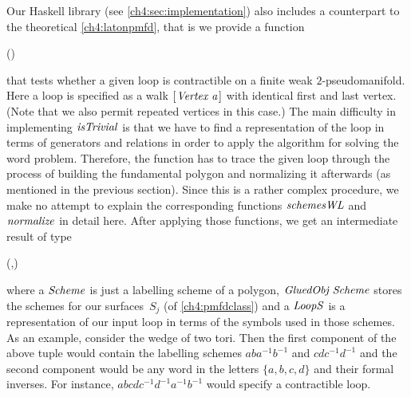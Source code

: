 \medskip
Our Haskell library (see \cref{ch4:sec:implementation}) also includes a
counterpart to the theoretical \cref{ch4:latonpmfd}, that is we provide
a function\begin{hscode}\SaveRestoreHook
{}%
%
%
\>[4]{}\mathbin{::}(\;)\Rightarrow {}\;\to {}\;\to {}\<[E]%
\ColumnHook
\end{hscode}\resethooks
that tests whether a given loop is contractible on a finite weak
$2$-pseudomanifold. Here a loop is specified as a walk \ensuremath{[\mskip1.5mu \Conid{Vertex}\;\Varid{a}\mskip1.5mu]} 
 with identical first and last vertex.
(Note that we also permit repeated vertices in this case.)
The main difficulty in implementing \ensuremath{\Varid{isTrivial}} is that we have
to find a representation of the loop in terms of generators and relations
in order to apply the algorithm for solving the word problem. Therefore,
the function has to trace the given loop through the process of building
the fundamental polygon and normalizing it afterwards (as mentioned in the
previous section). Since this is a rather complex procedure, we make no attempt
to explain the corresponding functions \ensuremath{\Varid{schemesWL}} and \ensuremath{\Varid{normalize}}
in detail here. After applying those functions, we get an intermediate
result of type \begin{hscode}\SaveRestoreHook
{}%
%
%
\>[3]{}(\;,){}\<[E]%
\ColumnHook
\end{hscode}\resethooks
where a \ensuremath{\Conid{Scheme}} is just a labelling scheme of a polygon, \ensuremath{\Conid{GluedObj}\;\Conid{Scheme}}
stores the schemes for our surfaces~$S_j$ (of \cref{ch4:pmfdclass})
and a \ensuremath{\Conid{LoopS}} is a representation of our input loop in terms of the symbols
used in those schemes.
As an example, consider the wedge of two tori. Then the first component of the
above tuple would contain the labelling schemes $aba^{-1}b^{-1}$ and
$cdc^{-1}d^{-1}$ and the second component would be any word in the letters
$\{a,b,c,d\}$ and their formal inverses. For instance,
$abcdc^{-1}d^{-1}a^{-1}b^{-1}$ would specify a contractible loop.

